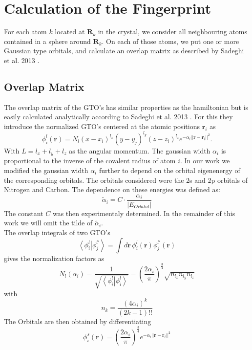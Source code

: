 \section{Calculation of the Fingerprint}
For each atom $k$ located at $\mathbf{R}_k$ in the crystal, we consider all neighbouring atoms contained in a sphere around $\mathbf{R}_k$. On each of those atoms, we put one or more Gaussian type orbitals, and calculate an overlap matrix as described by Sadeghi et al. 2013 \cite{Sadeghi2013}.
\subsection{Overlap Matrix}
The overlap matrix of the GTO's has similar properties as the hamiltonian but is easily calculated analytically according to Sadeghi et al. 2013 \cite{Sadeghi2013}. For this they introduce the normalized GTO's centered at the atomic positions $\mathbf{r}_i$ as
\begin{equation}\phi_i^l(\mathbf{r})=N_l(x-x_i)^{l_x}(y-y_j)^{l_y}(z-z_i)^{l_z}e^{-\alpha_i||\mathbf{r}-\mathbf{r}_i||^2}.\end{equation}
With $L=l_x+l_y+l_z$ as the angular momentum. The gaussian width $\alpha_i$ is proportional to the inverse of the covalent radius of atom $i$. In our work we modified the gaussian width $\alpha_i$ further to depend on the orbital eigenenergy of the corresponding orbitals. The orbitals considered were the 2s and 2p orbitals of Nitrogen and Carbon. The dependence on these energies was defined as:
\begin{equation}\label{eq:const}\tilde{\alpha}_i=C\cdot\frac{\alpha_i}{\left|E_{Orbital}\right|}\end{equation} 
The constant $C$ was then experimentaly determined. In the remainder of this work we will omit the tilde of $\tilde{\alpha}_i$.\\
The overlap integrals of two GTO's 
\begin{equation}\left<\phi_i^l\right|\left.\phi_j^{l'}\right>=\int d\mathbf{r}\,\phi_i^l(\mathbf{r})\phi^{l'}_j(\mathbf{r})\end{equation}
gives the normalization factors as
\begin{equation}N_l(\alpha_i)=\frac{1}{\sqrt{\left<\phi_i^l\right|\left.\phi_i^l\right>}}=\left(\frac{2\alpha_i}{\pi}\right)^{\frac{3}{4}}\sqrt{n_{l_x}n_{l_y}n_{l_z}}\end{equation}
with
$$n_k=\frac{(4\alpha_i)^k}{(2k-1)!!}$$
The Orbitals are then obtained by differentiating
$$\phi_i^s(\mathbf{r})=\left(\frac{2\alpha_i}{\pi}\right)^{\frac{3}{4}}e^{-\alpha_i||\mathbf{r}-\mathbf{r}_i||^2}$$
